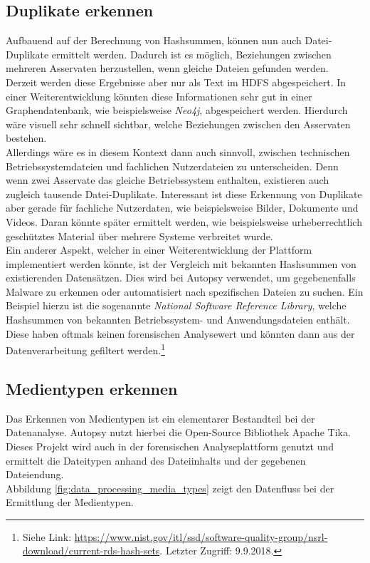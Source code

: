 \subsection{Duplikate erkennen}
\label{subsec:duplicate_files}
Aufbauend auf der Berechnung von Hashsummen, können nun auch Datei-Duplikate ermittelt werden. Dadurch ist es möglich, Beziehungen zwischen mehreren Asservaten herzustellen, wenn gleiche Dateien gefunden werden.\\
Derzeit werden diese Ergebnisse aber nur als Text im HDFS abgespeichert. In einer Weiterentwicklung könnten diese Informationen sehr gut in einer Graphendatenbank, wie beispielsweise \textit{Neo4j}, abgespeichert werden. Hierdurch wäre visuell sehr schnell sichtbar, welche Beziehungen zwischen den Asservaten bestehen.\\ 
Allerdings wäre es in diesem Kontext dann auch sinnvoll, zwischen technischen Betriebssystemdateien und fachlichen Nutzerdateien zu unterscheiden. Denn wenn zwei Asservate das gleiche Betriebssystem enthalten, existieren auch zugleich tausende Datei-Duplikate. Interessant ist diese Erkennung von Duplikate aber gerade für fachliche Nutzerdaten, wie beispielsweise Bilder, Dokumente und Videos. Daran könnte später ermittelt werden, wie beispielsweise urheberrechtlich geschütztes Material über mehrere Systeme verbreitet wurde.\\

\noindent
Ein anderer Aspekt, welcher in einer Weiterentwicklung der Plattform implementiert werden könnte, ist der Vergleich mit bekannten Hashsummen von existierenden Datensätzen. Dies wird bei Autopsy verwendet, um gegebenenfalls Malware zu erkennen oder automatisiert nach spezifischen Dateien zu suchen. Ein Beispiel hierzu ist die sogenannte \textit{National Software Reference Library}, welche Hashsummen von bekannten Betriebssystem- und Anwendungsdateien enthält. Diese haben oftmals keinen forensischen Analysewert und könnten dann aus der Datenverarbeitung gefiltert werden.\footnote{Siehe Link: \url{https://www.nist.gov/itl/ssd/software-quality-group/nsrl-download/current-rds-hash-sets}. Letzter Zugriff: 9.9.2018.} \cite[S. 36]{digital_forensics}

\subsection{Medientypen erkennen}
\label{subsec:media_types}

Das Erkennen von Medientypen ist ein elementarer Bestandteil bei der Datenanalyse. Autopsy nutzt hierbei die Open-Source Bibliothek Apache Tika\texttrademark. Dieses Projekt wird auch in der forensischen Analyseplattform genutzt und ermittelt die Dateitypen anhand des Dateiinhalts und der gegebenen Dateiendung.\\
Abbildung \ref{fig:data_processing_media_types} zeigt den Datenfluss bei der Ermittlung der Medientypen.\\

